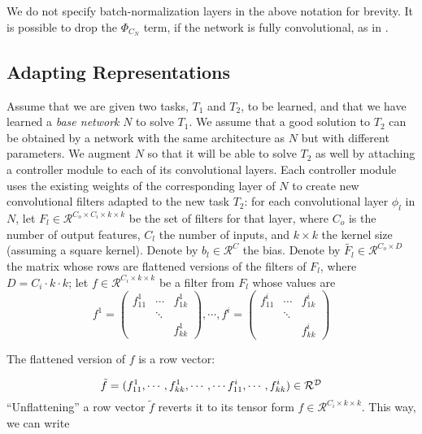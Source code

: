 \documentclass[10pt,journal,compsoc]{IEEEtran}
\begin{document}
We do not specify batch-normalization layers in the above notation
for brevity. It is possible to drop the $\Phi_{C_{N}}$ term, if the
network is fully convolutional, as in \cite{long2015fully}.

\subsection{Adapting Representations\label{subsec:Adapting-Representations}}

Assume that we are given two tasks, $T_{1}$ and $T_{2}$, to be learned,
and that we have learned a \emph{base network }$N$ to solve $T_{1}$.
We assume that a good solution to $T_{2}$ can be obtained by a network
with the same architecture as $N$ but with different parameters.
We augment $N$ so that it will be able to solve $T_{2}$ as well
by attaching a controller module to each of its convolutional layers.
Each controller module uses the existing weights of the corresponding
layer of $N$ to create new convolutional filters adapted to the new
task $T_{2}$: for each convolutional layer $\phi_{l}$ in $N$, let
$F_{l}\in\mathcal{R}^{C_{o}\times C_{i}\times k\times k}$ be the
set of filters for that layer, where $C_{o}$ is the number of output
features, $C_{l}$ the number of inputs, and $k\times k$ the kernel
size (assuming a square kernel). Denote by $b_{l}\in\mathcal{R}^{C}$
the bias. Denote by $\tilde{F_{l}}\in\mathcal{R}^{C_{o}\times D}$
the matrix whose rows are flattened versions of the filters of $F_{l}$,
where $D=C_{i}\cdot k\cdot k$; let $f\in\mathcal{R}^{C_{i}\times k\times k}$
be a filter from $F_{l}$ whose values are 
\begin{equation}
f^{1}=\left(\begin{array}{ccc}
f_{11}^{1} & \cdots & f_{1k}^{1}\\
 & \ddots\\
 &  & f_{kk}^{1}
\end{array}\right),\cdots,f^{i}=\left(\begin{array}{ccc}
f_{11}^{i} & \cdots & f_{1k}^{i}\\
 & \ddots\\
 &  & f_{kk}^{i}
\end{array}\right)\label{eq:matrix-form}
\end{equation}

The flattened version of $f$ is a row vector:

\begin{equation}
\tilde{f}=(f_{11}^{1},\cdots,f_{kk}^{1},\cdots,\cdots f_{11}^{i},\cdots,f_{kk}^{i})\in\mbox{\ensuremath{\mathcal{R^{D}}}}\label{eq: flattened}
\end{equation}
``Unflattening'' a row vector $\tilde{f}$ reverts it to its tensor
form $f\in\mathcal{R}^{C_{i}\times k\times k}.$ This way, we can
write 
\end{document}

